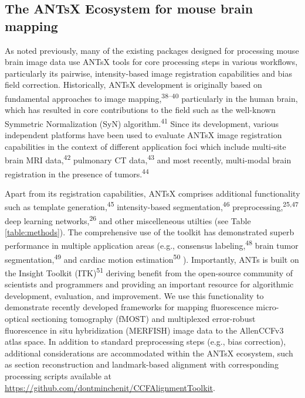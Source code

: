 \documentclass[
  12pt,
]{article}
\begin{document}
\hypertarget{the-antsx-ecosystem-for-mouse-brain-mapping}{%
\subsection{The ANTsX Ecosystem for mouse brain
mapping}\label{the-antsx-ecosystem-for-mouse-brain-mapping}}



As noted previously, many of the existing packages designed for
processing mouse brain image data use ANTsX tools for core processing
steps in various workflows, particularly its pairwise, intensity-based
image registration capabilities and bias field correction. Historically,
ANTsX development is originally based on fundamental approaches to image
mapping,\textsuperscript{38--40} particularly in the human brain, which
has resulted in core contributions to the field such as the well-known
Symmetric Normalization (SyN) algorithm.\textsuperscript{41} Since its
development, various independent platforms have been used to evaluate
ANTsX image registration capabilities in the context of different
application foci which include multi-site brain MRI
data,\textsuperscript{42} pulmonary CT data,\textsuperscript{43} and
most recently, multi-modal brain registration in the presence of
tumors.\textsuperscript{44}

Apart from its registration capabilities, ANTsX comprises additional
functionality such as template generation,\textsuperscript{45}
intensity-based segmentation,\textsuperscript{46}
preprocessing,\textsuperscript{25,47} deep learning
networks,\textsuperscript{26} and other miscelleneous utilties (see
Table \ref{table:methods}). The comprehensive use of the toolkit has
demonstrated superb performance in multiple application areas (e.g.,
consensus labeling,\textsuperscript{48} brain tumor
segmentation,\textsuperscript{49} and cardiac motion
estimation\textsuperscript{50} ). Importantly, ANTs is built on the
Insight Toolkit (ITK)\textsuperscript{51} deriving benefit from the
open-source community of scientists and programmers and providing an
important resource for algorithmic development, evaluation, and
improvement. We use this functionality to demonstrate recently developed
frameworks for mapping fluorescence micro-optical sectioning tomography
(fMOST) and multiplexed error-robust fluorescence in situ hybridization
(MERFISH) image data to the AllenCCFv3 atlas space. In addition to
standard preprocessing steps (e.g., bias correction), additional
considerations are accommodated within the ANTsX ecosystem, such as
section reconstruction and landmark-based alignment with corresponding
processing scripts available at
\url{https://github.com/dontminchenit/CCFAlignmentToolkit}.
\end{document}
